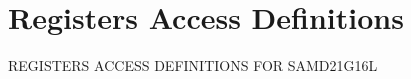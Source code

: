 \hypertarget{group___s_a_m_d21_g16_l__reg}{}\section{Registers Access Definitions}
\label{group___s_a_m_d21_g16_l__reg}
R\+E\+G\+I\+S\+T\+E\+RS A\+C\+C\+E\+SS D\+E\+F\+I\+N\+I\+T\+I\+O\+NS F\+OR S\+A\+M\+D21\+G16L 